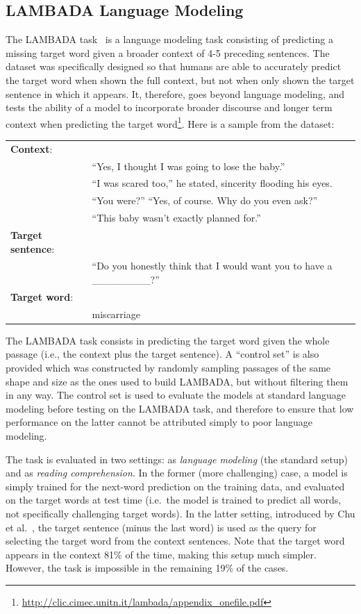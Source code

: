 \subsection{LAMBADA Language Modeling}
The LAMBADA task~\citep{paperno2016lambada} is a language modeling task consisting of predicting a missing target word given a broader context of 4-5 preceding sentences. The dataset was specifically designed so that humans are able to accurately predict the target word when shown the full context, but not when only shown the target sentence in which it appears. It, therefore, goes beyond language modeling, and tests the ability of a model to incorporate broader discourse and longer term context when predicting the target word\footnote{\url{http://clic.cimec.unitn.it/lambada/appendix_onefile.pdf}}.
Here is a sample from the dataset:

\begin{table}[h!]
\fontsize{8}{10}\selectfont
\begin{tabular}{l l}
\textbf{Context}: & \\
& ``Yes, I thought I was going to lose the baby.'' \\
&  ``I was scared too,'' he stated, sincerity flooding his eyes. \\ 
&  ``You were?'' ``Yes, of course. Why do you even ask?''  \\
&  ``This baby wasn't exactly planned for.''
\\
\textbf{Target sentence}: & \\
& ``Do you honestly think that I would want you to have a \_\_\_\_\_\_\_\_?'' 
\\
\textbf{Target word}:  & \\  
& miscarriage
\end{tabular}
\end{table}

The LAMBADA task consists in predicting the target word given the whole passage (i.e., the context plus the target sentence). A ``control set''  is also provided which was constructed by randomly sampling passages of the same shape and size as the ones used to build LAMBADA, but without filtering them in any way. The control set is used to evaluate the models at standard language modeling before testing on the LAMBADA task, and therefore to ensure that low performance on the latter cannot be attributed simply to poor language modeling.

The task is evaluated in two settings: as \emph{language modeling} (the standard setup) and as \emph{reading comprehension}. In the former (more challenging) case, a model is simply trained for the next-word prediction on the training data, and evaluated on the target words at test time (i.e.\ the model is trained to predict all words, not specifically challenging target words).  In the latter setting, introduced by Chu et al.~\cite{chu2017broad}, the target sentence (minus the last word) is used as the query for selecting the target word from the context sentences. Note that the target word appears in the context 81\% of the time, making this setup much simpler. However, the task is impossible in the remaining 19\% of the cases.

